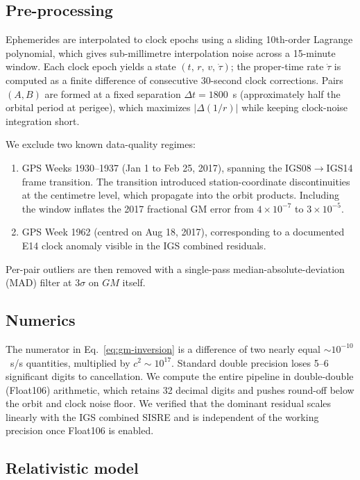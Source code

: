 \documentclass[11pt,a4paper]{article}
\begin{document}
\subsection{Pre-processing}

Ephemerides are interpolated to clock epochs using a sliding 10th-order Lagrange polynomial, which gives sub-millimetre interpolation noise across a 15-minute window. Each clock epoch yields a state $(t,\,r,\,v,\,\dot\tau)$; the proper-time rate $\dot\tau$ is computed as a finite difference of consecutive 30-second clock corrections. Pairs $(A,B)$ are formed at a fixed separation $\Delta t = 1800$~s (approximately half the orbital period at perigee), which maximizes $|\Delta(1/r)|$ while keeping clock-noise integration short.

We exclude two known data-quality regimes:
\begin{enumerate}
    \item GPS Weeks 1930--1937 (Jan 1 to Feb 25, 2017), spanning the IGS08$\to$IGS14 frame transition. The transition introduced station-coordinate discontinuities at the centimetre level, which propagate into the orbit products. Including the window inflates the 2017 fractional GM error from $4 \times 10^{-7}$ to $3 \times 10^{-5}$.
    \item GPS Week 1962 (centred on Aug 18, 2017), corresponding to a documented E14 clock anomaly visible in the IGS combined residuals.
\end{enumerate}
Per-pair outliers are then removed with a single-pass median-absolute-deviation (MAD) filter at $3\sigma$ on $GM$ itself.

\subsection{Numerics}

The numerator in Eq.~\eqref{eq:gm-inversion} is a difference of two nearly equal $\sim 10^{-10}$~s/s quantities, multiplied by $c^2 \sim 10^{17}$. Standard double precision loses 5--6 significant digits to cancellation. We compute the entire pipeline in double-double (Float106) arithmetic, which retains 32 decimal digits and pushes round-off below the orbit and clock noise floor. We verified that the dominant residual scales linearly with the IGS combined SISRE \citep{Galluzzo2021} and is independent of the working precision once Float106 is enabled.

\subsection{Relativistic model}
\end{document}
